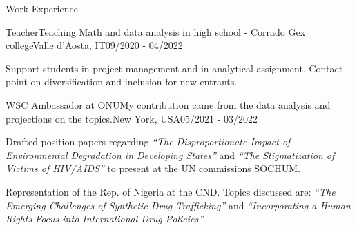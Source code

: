 \documentclass{article}
\newlength{\tabin}
\newlength{\secsep}
\newcommand{\lineunder}{\vspace*{-8pt} \\ \hspace*{-6pt} \hrulefill \\ \vspace*{-15pt}}
\newenvironment{tabbedsection}[1]{
  \begin{list}{}{
      \setlength{\itemsep}{0pt}
      \setlength{\labelsep}{0pt}
      \setlength{\labelwidth}{0pt}
      \setlength{\leftmargin}{\tabin}
      \setlength{\rightmargin}{\tabin}
      \setlength{\listparindent}{0pt}
      \setlength{\parsep}{0pt}
      \setlength{\parskip}{0pt}
      \setlength{\partopsep}{0pt}
      \setlength{\topsep}{#1}
    }
  \item[]
}{\end{list}}
\newenvironment{resume_section}[1]{
  \filbreak
  \vspace{2\secsep}
  \textsc{\large#1}
  \lineunder
  \begin{tabbedsection}{\secsep}
}{\end{tabbedsection}}
\newenvironment{subitems}{
  \renewcommand{\labelitemi}{-}
  \begin{itemize}
      \setlength{\labelsep}{1em}
}{\end{itemize}}
\newenvironment{resume_employer}[4]{
  \vspace{\secsep}
  \textbf{#1} \\ 
  \indent {\small #2} \hfill {\footnotesize#3 (#4)}
  \begin{tabbedsection}{0pt}
  \begin{subitems}
}{\end{subitems}\end{tabbedsection}}
\begin{document}
\begin{resume_section}{Work Experience}
  

  
  \begin{resume_employer}{Teacher}{Teaching Math and data analysis in high school - Corrado Gex college}{Valle d'Aosta, IT}{09/2020 - 04/2022}
    \item Support students in project management and in analytical assignment. Contact point on diversification and inclusion for new entrants.
  
  \end{resume_employer}
    
    \begin{resume_employer}{WSC Ambassador at ONU}{My contribution came from the data analysis and projections on the topics.}{New York, USA}{05/2021 - 03/2022}
    \item Drafted position papers regarding \textit{“The Disproportionate Impact of Environmental Degradation in Developing States”} and \textit{“The Stigmatization of Victims of HIV/AIDS”} to present at the UN commissions SOCHUM.
    \item Representation of the Rep. of Nigeria at the CND. Topics discussed are: \textit{“The Emerging Challenges of Synthetic Drug Trafficking”} and \textit{“Incorporating a Human Rights Focus into International Drug Policies”}.

  
  \end{resume_employer}
  
\end{resume_section}
\end{document}
